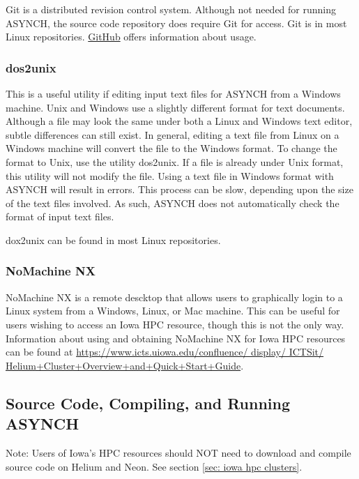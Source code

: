 \documentclass[12pt]{article}
\begin{document}
Git is a distributed revision control system. Although not needed for running ASYNCH, the source code repository does require Git for access. Git is in most Linux repositories. \href{https://github.com/}{GitHub} offers information about usage.

\subsubsection{dos2unix} \label{sec: dos2unix}

This is a useful utility if editing input text files for ASYNCH from a Windows machine. Unix and Windows use a slightly different format for text documents. Although a file may look the same under both a Linux and Windows text editor, subtle differences can still exist. In general, editing a text file from Linux on a Windows machine will convert the file to the Windows format. To change the format to Unix, use the utility dos2unix. If a file is already under Unix format, this utility will not modify the file. Using a text file in Windows format with ASYNCH will result in errors. This process can be slow, depending upon the size of the text files involved. As such, ASYNCH does not automatically check the format of input text files.

dox2unix can be found in most Linux repositories.

\subsubsection{NoMachine NX} \label{sec: nomachine nx}

NoMachine NX is a remote descktop that allows users to graphically login to a Linux system from a Windows, Linux, or Mac machine. This can be useful for users wishing to access an Iowa HPC resource, though this is not the only way. Information about using and obtaining NoMachine NX for Iowa HPC resources can be found at \hspace{.1cm} \url{https://www.icts.uiowa.edu/confluence/ display/ ICTSit/ Helium+Cluster+Overview+and+Quick+Start+Guide}.


\subsection{Source Code, Compiling, and Running ASYNCH} \label{sec: source code, compiling, and running asynch}

Note: Users of Iowa's HPC resources should NOT need to download and compile source code on Helium and Neon. See section \ref{sec: iowa hpc clusters}.
\end{document}
